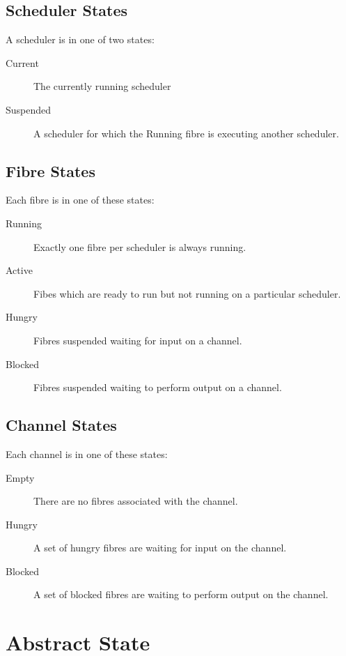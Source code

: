 \documentclass[oneside]{book}
\begin{document}
\subsection{Scheduler States}
A scheduler is in one of two states:
\begin{description}
\item[Current] The currently running scheduler
\item[Suspended] A scheduler for which the Running fibre is
executing another scheduler.
\end{description}

\subsection{Fibre States}
Each fibre is in one of these states:
\begin{description}
\item[Running] Exactly one fibre per scheduler is always running.
\item[Active] Fibes which are ready to run but not running on a particular scheduler.
\item[Hungry] Fibres suspended waiting for input on a channel.
\item[Blocked] Fibres suspended waiting to perform output on a channel.
\end{description}

\subsection{Channel States}
Each channel is in one of these states:
\begin{description}
\item[Empty] There are no fibres associated with the channel.
\item[Hungry] A set of hungry fibres are waiting for input on the channel.
\item[Blocked] A set of blocked fibres are waiting to perform output on the channel.
\end{description}


\section{Abstract State}
\end{document}
